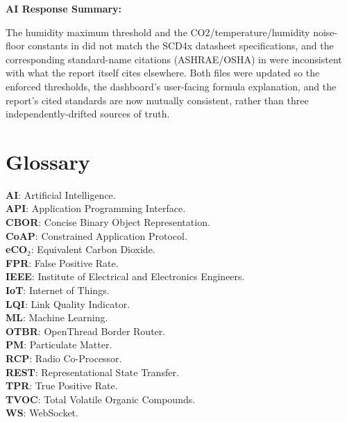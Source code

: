 \documentclass[conference]{IEEEtran}
\begin{document}
\noindent\textbf{AI Response Summary:}\par

The humidity maximum threshold and the CO2/temperature/humidity noise-floor constants in \texttt{} did not match the SCD4x datasheet specifications, and the corresponding standard-name citations (ASHRAE/OSHA) in \texttt{} were inconsistent with what the report itself cites elsewhere. Both files were updated so the enforced thresholds, the dashboard's user-facing formula explanation, and the report's cited standards are now mutually consistent, rather than three independently-drifted sources of truth.


\section*{Glossary}
\textbf{AI}: Artificial Intelligence.\\
\textbf{API}: Application Programming Interface.\\
\textbf{CBOR}: Concise Binary Object Representation.\\
\textbf{CoAP}: Constrained Application Protocol.\\
\textbf{eCO$_2$}: Equivalent Carbon Dioxide.\\
\textbf{FPR}: False Positive Rate.\\
\textbf{IEEE}: Institute of Electrical and Electronics Engineers.\\
\textbf{IoT}: Internet of Things.\\
\textbf{LQI}: Link Quality Indicator.\\
\textbf{ML}: Machine Learning.\\
\textbf{OTBR}: OpenThread Border Router.\\
\textbf{PM}: Particulate Matter.\\
\textbf{RCP}: Radio Co-Processor.\\
\textbf{REST}: Representational State Transfer.\\
\textbf{TPR}: True Positive Rate.\\
\textbf{TVOC}: Total Volatile Organic Compounds.\\
\textbf{WS}: WebSocket.\\
\end{document}
